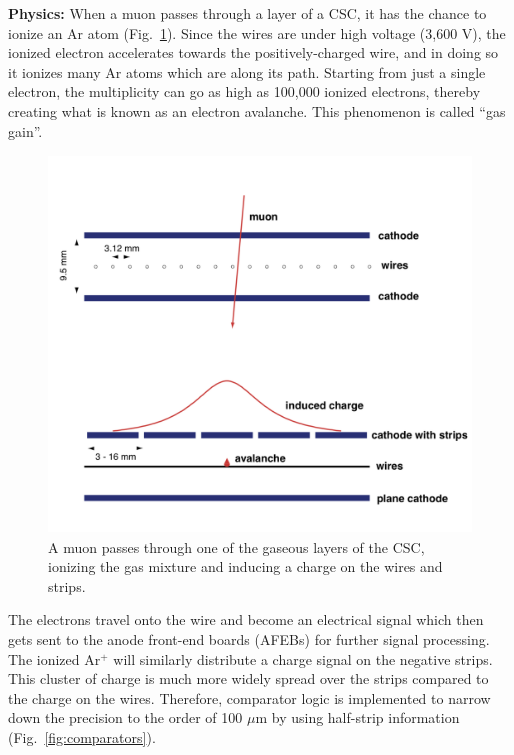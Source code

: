\textbf{Physics:}
When a muon passes through a layer of a CSC, it has the chance to ionize an Ar atom (Fig.~\ref{fig:elec_avalanche}).
Since the wires are under high voltage (3,600 V), the ionized electron accelerates towards the positively-charged wire, and in doing so it ionizes many Ar atoms which are along its path. 
Starting from just a single electron, the multiplicity can go as high as 100,000 ionized electrons, thereby creating what is known as an electron avalanche. 
This phenomenon is called ``gas gain''.
\begin{figure}[pbth]
\centering
\includegraphics[width=15cm,height=10cm,keepaspectratio]{figures/cms/muonsys/csc_elec_avalanche_old.png}
    \caption{
    A muon passes through one of the gaseous layers of the CSC, ionizing the gas mixture and inducing a charge on the wires and strips. 
    }
    \label{fig:elec_avalanche}
\end{figure}
The electrons travel onto the wire and become an electrical signal which then gets sent to the anode front-end boards (AFEBs) for further signal processing.
The ionized Ar$^+$ will similarly distribute a charge signal on the negative strips. 
This cluster of charge is much more widely spread over the strips compared to the charge on the wires.
Therefore, comparator logic is implemented to narrow down the precision to the order of 100 $\mu$m by using half-strip information (Fig.~\ref{fig:comparators}).
